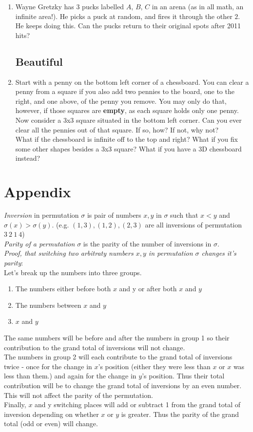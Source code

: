 \documentclass[11pt,a5paper]{article}
\begin{document}
\begin{enumerate}
	\item{Wayne Gretzky has 3 pucks labelled $A$, $B$, $C$ in an arena (as in all math, an infinite area!). He picks a puck at random, and fires it through the other $2$. He keeps doing this. Can the pucks return to their original spots after 2011 hits?}

	
	\subsection*{Beautiful}
	\item{Start with a penny on the bottom left corner of a chessboard.  You can clear a penny from a square if you also add two pennies to the board, one to the right, and one above, of the penny you remove.  You may only do that, however, if those squares are \textbf{empty}, as each square holds only one penny.\\
Now consider a 3x3 square situated in the bottom left corner.  Can you ever clear all the pennies out of that square.  If so, how?  If not, why not? \\
What if the chessboard is infinite off to the top and right?  What if you fix some other shapes besides a 3x3 square?  What if you have a 3D chessboard instead?}
\end{enumerate}

\section{Appendix}
\emph{Inversion} in permutation $\sigma$ is pair of numbers $x, y$ in $\sigma$ such that $x < y$ and $\sigma(x) > \sigma(y)$. (e.g. $(1,3), (1,2), (2,3)$ are all inversions of permutation $3\ 2\ 1\ 4$)\\
\noindent\emph{Parity of a permutation} $\sigma$ is the parity of the number of inversions in $\sigma$.\\

\noindent\emph{Proof, that switching two arbitraty numbers $x, y$ in permutation $\sigma$ changes it's parity}:\\
Let's break up the numbers into three groups.
\begin{enumerate}
\item{The numbers either before both $x$ and y or after both $x$ and $y$}
\item{The numbers between $x$ and $y$}
\item{$x$ and $y$}
\end{enumerate}
The same numbers will be before and after the numbers in group 1 so their contribution to the grand total of inversions will not change. \\
The numbers in group 2 will each contribute to the grand total of inversions twice - once for the change in $x$'s position (either they were less than $x$ or $x$ was less than them.) and again for the change in $y$'s position. Thus their total contribution will be to change the grand total of inversions by an even number. This will not affect the parity of the permutation. \\
Finally, $x$ and y switching places will add or subtract 1 from the grand total of inversion depending on whether $x$ or $y$ is greater. Thus the parity of the grand total (odd or even) will change.
\end{document}
